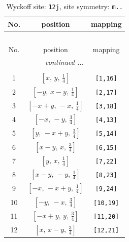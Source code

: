 \documentclass[fleqn,8pt]{jsarticle}
\begin{document}
\begin{longtable}{ccc}
\caption{Wyckoff site: {\tt 12j}, site symmetry: {\tt m..}}
 \\
 \hline \hline
No. & position & mapping \\ \hline \endfirsthead

\multicolumn{2}{l}{\tablename\ \thetable{}} \\
 \hline \hline
No. & position & mapping \\ \hline \endhead

 \hline \hline
\multicolumn{2}{r}{\footnotesize\it continued ...} \\ \endfoot

 \hline \hline
\multicolumn{2}{r}{} \\ \endlastfoot

1 & $\left[ x,\, y,\, \frac{1}{4} \right]$ & {\tt [1,16]} \\ \hline
2 & $\left[ - y,\, x - y,\, \frac{1}{4} \right]$ & {\tt [2,17]} \\ \hline
3 & $\left[ - x + y,\, - x,\, \frac{1}{4} \right]$ & {\tt [3,18]} \\ \hline
4 & $\left[ - x,\, - y,\, \frac{3}{4} \right]$ & {\tt [4,13]} \\ \hline
5 & $\left[ y,\, - x + y,\, \frac{3}{4} \right]$ & {\tt [5,14]} \\ \hline
6 & $\left[ x - y,\, x,\, \frac{3}{4} \right]$ & {\tt [6,15]} \\ \hline
7 & $\left[ y,\, x,\, \frac{1}{4} \right]$ & {\tt [7,22]} \\ \hline
8 & $\left[ x - y,\, - y,\, \frac{1}{4} \right]$ & {\tt [8,23]} \\ \hline
9 & $\left[ - x,\, - x + y,\, \frac{1}{4} \right]$ & {\tt [9,24]} \\ \hline
10 & $\left[ - y,\, - x,\, \frac{3}{4} \right]$ & {\tt [10,19]} \\ \hline
11 & $\left[ - x + y,\, y,\, \frac{3}{4} \right]$ & {\tt [11,20]} \\ \hline
12 & $\left[ x,\, x - y,\, \frac{3}{4} \right]$ & {\tt [12,21]} \\
\end{longtable}
\renewcommand{\arraystretch}{1.2}
\end{document}
